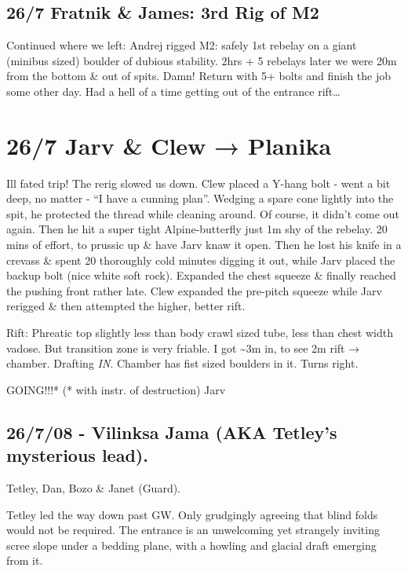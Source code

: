 \subsection{26/7 Fratnik \& James: 3rd Rig of
M2}\label{fratnik-james-3rd-rig-of-m2}

Continued where we left: Andrej rigged M2: safely 1st rebelay on a giant
(minibus sized) boulder of dubious stability. 2hrs + 5 rebelays later we
were 20m from the bottom \& out of spits. Damn! Return with 5+ bolts and
finish the job some other day. Had a hell of a time getting out of the
entrance rift\ldots{}

\section{26/7 Jarv \& Clew → Planika}\label{jarv-clew-planika}

Ill fated trip! The rerig slowed us down. Clew placed a Y-hang bolt -
went a bit deep, no matter - ``I have a cunning plan''. Wedging a spare
cone lightly into the spit, he protected the thread while cleaning
around. Of course, it didn't come out again. Then he hit a super tight
Alpine-butterfly just 1m shy of the rebelay. 20 mins of effort, to
prussic up \& have Jarv knaw it open. Then he lost his knife in a
crevass \& spent 20 thoroughly cold minutes digging it out, while Jarv
placed the backup bolt (nice white soft rock). Expanded the chest
squeeze \& finally reached the pushing front rather late. Clew expanded
the pre-pitch squeeze while Jarv rerigged \& then attempted the higher,
better rift.

Rift: Phreatic top slightly less than body crawl sized tube, less than
chest width vadose. But transition zone is very friable. I got
\textasciitilde{}3m in, to see 2m rift → chamber. Drafting \emph{IN}.
Chamber has fist sized boulders in it. Turns right.

GOING!!!* (* with instr. of destruction) Jarv

\subsection{26/7/08 - Vilinksa Jama (AKA Tetley's mysterious
lead).}\label{vilinksa-jama-aka-tetleys-mysterious-lead.}

Tetley, Dan, Bozo \& Janet (Guard).

Tetley led the way down past GW. Only grudgingly agreeing that blind
folds would not be required. The entrance is an unwelcoming yet
strangely inviting scree slope under a bedding plane, with a howling and
glacial draft emerging from it.

